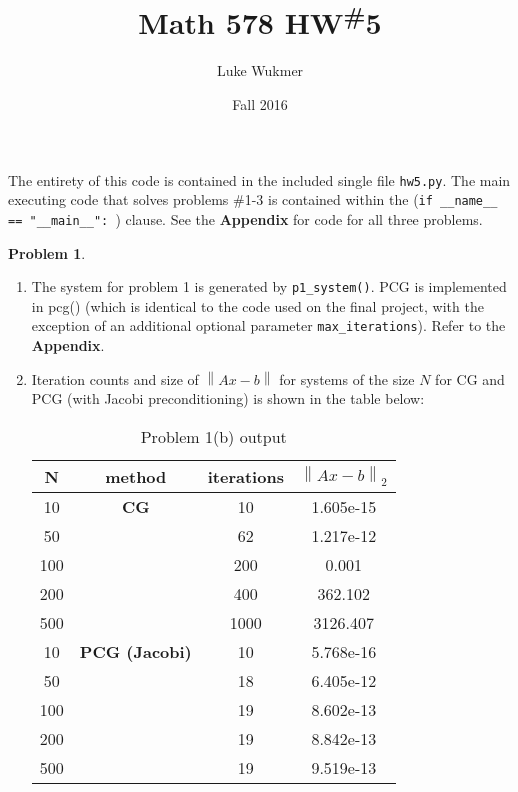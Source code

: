 \documentclass[10pt]{article}
\theoremstyle{definition}
\newtheorem{prob}{Problem}
\newcommand{\norm}[1]{\left\lVert#1\right\rVert}
\begin{document}
\title{Math 578 HW\textsuperscript{\#}5}
\author{Luke Wukmer}
\date{Fall 2016}
\maketitle \thispagestyle{empty} %




    The entirety of this code is contained in the included single file \texttt{hw5.py}. 
    The main executing code that solves problems \#1-3 is contained within the (\verb;if __name__ == "__main__": ;) clause. See the \textbf{Appendix} for code for all three problems.
    \begin{prob} 
    \begin{enumerate}[\bfseries(a)]
        \item
           The system for problem 1 is generated by \texttt{p1\_system()}. PCG is
           implemented in pcg() (which is identical to the code used on the final
           project, with the exception of an additional optional parameter
           \texttt{max\_iterations}). Refer to the \textbf{Appendix}.
           
        \item Iteration counts and size of $\norm{Ax-b}$ for systems of the size
        $N$ for CG and PCG (with Jacobi preconditioning) is shown in the table below:
        
        \begin{table}[h]
        \begin{center}
       \begin{tabular}{|c|c|c|c|}
       N & method & iterations & $\norm{Ax-b}_2$ \\
       \hline
       10 & \textbf{CG} & 10 & 1.605e-15 \\
       \hline
       50 & & 62 & 1.217e-12 \\
       \hline
       100 &  & 200 & 0.001 \\
       \hline
       200 &  & 400 & 362.102 \\
       \hline
       500 &  & 1000 & 3126.407 \\
       \hline
       \hline
       10 & \textbf{PCG (Jacobi)} &10 &5.768e-16 \\
       \hline
       50 & &18 & 6.405e-12 \\
       \hline
       100 & &19 & 8.602e-13 \\
       \hline
       200 & &19 &8.842e-13 \\
       \hline
       500 & &19 &9.519e-13 \\
       \hline
        \end{tabular}
        \caption{Problem 1(b) output}
        \end{center}
        \end{table}
        

\end{enumerate}
\end{prob}
\end{document}
